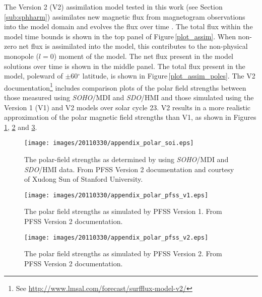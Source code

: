 \documentclass[namedreferences]{solarphysics}
\begin{document}
\begin{article}
The Version 2 (V2) assimilation model tested in this work (see Section\,\ref{sub:sphharm}) assimilates new magnetic flux from magnetogram observations into the model domain and evolves the flux over time \citep{Schrijver:2001,Schrijver:2001c}. The total flux within the model time bounds is shown in the top panel of Figure\,\ref{plot_assim}. When non-zero net flux is assimilated into the model, this contributes to the non-physical monopole ($l$$=$0) moment of the model. The net flux present in the model solutions over time is shown in the middle panel. The total flux present in the model, poleward of $\pm$60$^\circ$ latitude, is shown in Figure\,\ref{plot_assim_poles}. The V2 documentation\footnote{See \url{http://www.lmsal.com/forecast/surfflux-model-v2/}} includes comparison plots of the polar field strengths between those measured using \emph{SOHO}/MDI and \emph{SDO}/HMI and those simulated using the Version 1 (V1) and V2 models over solar cycle 23. V2 results in a more realistic approximation of the polar magnetic field strengths than V1, as shown in Figures\,\ref{plot_soi_poles}, \ref{plot_pfss_poles_v1} and \ref{plot_pfss_poles_v2}.

\begin{figure}[!t]
\begin{center}
\texttt{[image: images/20110330/appendix\_polar\_soi.eps]}
\end{center}
\caption{The polar-field strengths as determined by using \emph{SOHO}/MDI and \emph{SDO}/HMI data. From PFSS Version 2 documentation and courtesy of Xudong Sun of Stanford University.}
\label{plot_soi_poles}
\end{figure}

\begin{figure}[!t]
\begin{center}
\texttt{[image: images/20110330/appendix\_polar\_pfss\_v1.eps]}
\end{center}
\caption{The polar field strengths as simulated by PFSS Version 1. From PFSS Version 2 documentation.}
\label{plot_pfss_poles_v1}
\end{figure}

\begin{figure}[!t]
\begin{center}
\texttt{[image: images/20110330/appendix\_polar\_pfss\_v2.eps]}
\end{center}
\caption{The polar field strengths as simulated by PFSS Version 2. From PFSS Version 2 documentation.}
\label{plot_pfss_poles_v2}
\end{figure}


\end{article}
\end{document}
